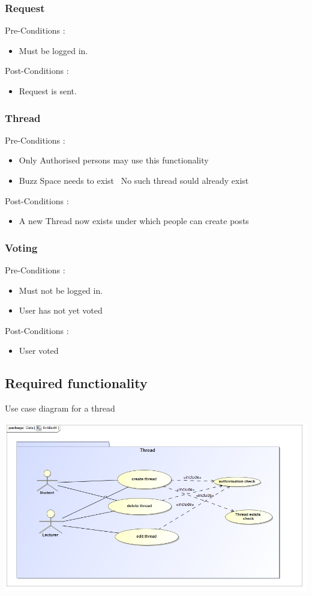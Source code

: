 \documentclass[12pt, oneside]{article}
\begin{document}
			\subsubsection{Request}
				Pre-Conditions : \begin{itemize}
							\item Must be logged in.
						     \end{itemize}
				Post-Conditions : \begin{itemize}
							\item Request is sent.
						     \end{itemize}
			\subsubsection{Thread}
				Pre-Conditions : \begin{itemize}
							\item Only Authorised persons may use this functionality
							\item Buzz Space needs to exist 
							\ No such thread sould already exist
						     \end{itemize}
				Post-Conditions : \begin{itemize}
							\item A new Thread now exists under which people can create posts
						     \end{itemize}
			\subsubsection{Voting}
				Pre-Conditions : \begin{itemize}
							\item Must not be logged in.
							\item User has not yet voted
						     \end{itemize}
				Post-Conditions : \begin{itemize}
							\item User voted
						     \end{itemize}	

	\subsection{Required functionality}
		Use case diagram for a thread
		
			 \includegraphics[scale=1]{thread}
			 
\end{document}
